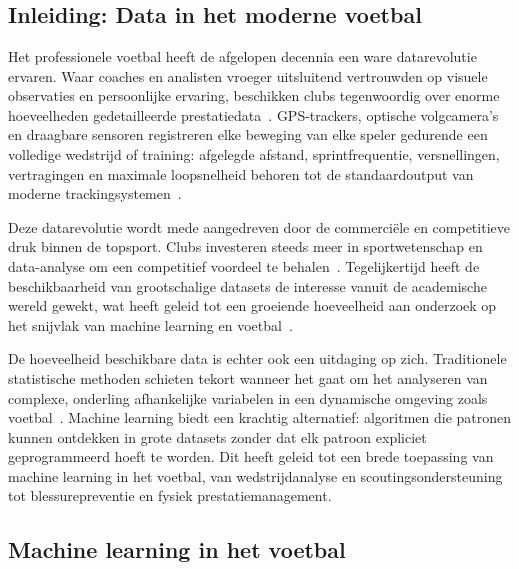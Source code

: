 \chapter{}%
\label{ch:stand-van-zaken}

\section{Inleiding: Data in het moderne voetbal}
 
Het professionele voetbal heeft de afgelopen decennia een ware datarevolutie ervaren. Waar coaches en analisten vroeger uitsluitend vertrouwden op visuele observaties en persoonlijke ervaring, beschikken clubs tegenwoordig over enorme hoeveelheden gedetailleerde prestatiedata~\autocite{ObiEtAl2024}. GPS-trackers, optische volgcamera's en draagbare sensoren registreren elke beweging van elke speler gedurende een volledige wedstrijd of training: afgelegde afstand, sprintfrequentie, versnellingen, vertragingen en maximale loopsnelheid behoren tot de standaardoutput van moderne trackingsystemen~\autocite{sports6040130}.
 
Deze datarevolutie wordt mede aangedreven door de commerciële en competitieve druk binnen de topsport. Clubs investeren steeds meer in sportwetenschap en data-analyse om een competitief voordeel te behalen~\autocite{HoutmeyersEtAl2021}. Tegelijkertijd heeft de beschikbaarheid van grootschalige datasets de interesse vanuit de academische wereld gewekt, wat heeft geleid tot een groeiende hoeveelheid aan onderzoek op het snijvlak van machine learning en voetbal~\autocite{Rico-González2023}.
 
De hoeveelheid beschikbare data is echter ook een uitdaging op zich. Traditionele statistische methoden schieten tekort wanneer het gaat om het analyseren van complexe, onderling afhankelijke variabelen in een dynamische omgeving zoals voetbal~\autocite{DavisEtAl2024}. Machine learning biedt een krachtig alternatief: algoritmen die patronen kunnen ontdekken in grote datasets zonder dat elk patroon expliciet geprogrammeerd hoeft te worden. Dit heeft geleid tot een brede toepassing van machine learning in het voetbal, van wedstrijdanalyse en scoutingsondersteuning tot blessurepreventie en fysiek prestatiemanagement.
 
\section{Machine learning in het voetbal}
 
